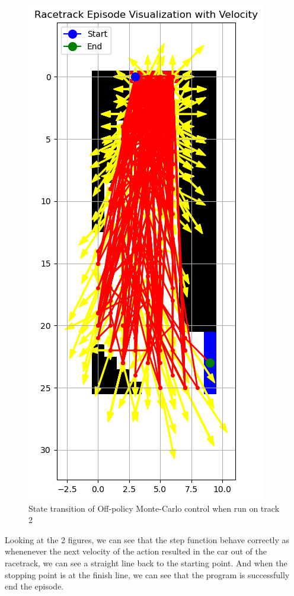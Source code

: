 \documentclass{article}
\begin{document}
\begin{figure}[h!]
\centering
\includegraphics[scale=0.9]{./images/mc_test_racetrack2.png}
\caption{State transition of Off-policy Monte-Carlo control when run on track 2}
\label{fig:mc_test_racetrack2}
\end{figure}

Looking at the 2 figures, we can see that the step function behave correctly as
whenenever the next velocity of the action resulted in the car out of the
racetrack, we can see a straight line back to the starting point. And when the
stopping point is at the finish line, we can see that the program is successfully
end the episode.
\end{document}
